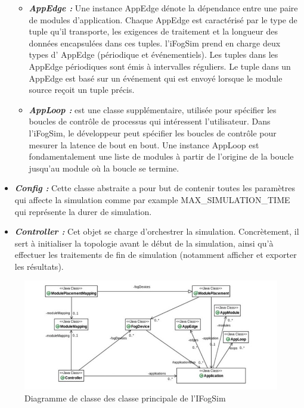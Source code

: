\begin{itemize}
    \begin{itemize}
        \item \textbf{\emph{AppEdge :}} Une instance AppEdge dénote la dépendance entre une paire de modules d'application. Chaque AppEdge est caractérisé par le type de tuple qu'il transporte, les exigences de traitement et la longueur des données encapsulées dans ces tuples. l’iFogSim prend en charge deux types d’ AppEdge (périodique et événementiels). Les tuples dans les AppEdge périodiques sont émis à intervalles réguliers. Le tuple dans un AppEdge est basé sur un événement qui est envoyé lorsque le module source reçoit un tuple précis.
        \item \textbf{\emph{AppLoop :}} est une classe supplémentaire, utilisée pour spécifier les boucles de contrôle de processus qui intéressent l'utilisateur. Dans l’iFogSim, le développeur peut spécifier les boucles de contrôle pour mesurer la latence de bout en bout. Une instance AppLoop est fondamentalement une liste de modules à partir de l'origine de la boucle jusqu'au module où la boucle se termine.
    \end{itemize}
    \item \textbf{\emph{Config :}} Cette classe abstraite a pour but de contenir toutes les paramètres qui affecte la simulation comme par example MAX\_SIMULATION\_TIME qui représente la durer de simulation.
    \item \textbf{\emph{Controller :}} Cet objet se charge d’orchestrer la simulation. Concrètement, il sert à initialiser la topologie avant le début de la simulation, ainsi qu’à effectuer les traitements de fin de simulation (notamment afficher et exporter les résultats).
\end{itemize}
\begin{figure}[H]
    \centering
    \includegraphics[]{src/ressources/Diagramme de classe.jpg}
    \caption{Diagramme de classe des classe principale de l'IFogSim}
    \label{fig:}
\end{figure}
